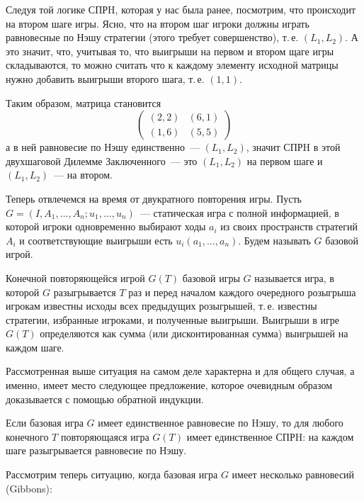 Следуя той логике СПРH,  которая у нас была ранее, посмотрим, что
происходит на втором шаге игры. Ясно, что на втором шаг игроки
должны играть равновесные по Нэшу стратегии (этого требует совершенство),
т.\,е. $(L_1,L_2)$.  А это значит, что, учитывая то, что выигрыши на первом
и втором щаге игры складываются, то можно считать что к каждому
элементу исходной матрицы нужно добавить выигрыши второго шага, т.\,е. $(1,1)$.

Таким образом, матрица становится
$$
(\begin{array}{cc}
(2,2)&(6,1)\\
(1,6)&(5,5) \end{array})
$$
а в ней равновесие по Нэшу единственно~--- $(L_1,L_2)$, значит СПРH в этой
двухшаговой Дилемме Заключенного~--- это $(L_1,L_2)$ на
первом шаге и $(L_1,L_2)$~--- на втором.

Теперь отвлечемся на время от двукратного повторения игры. Пусть
$G=(I, A_1,\ldots,A_n;u_1,\ldots,u_n)$~--- статическая игра с полной
информацией, в которой игроки одновременно выбирают ходы $a_i$ из
своих пространств стратегий $A_i$ и соответствующие выигрыши есть
$u_i(a_1,\ldots,a_n)$.  Будем называть $G$ базовой игрой.

\begin{definition}
Конечной повторяющейся игрой $G(T)$ базовой игры $G$ называется игра,
в которой $G$ разыгрывается $T$ раз и перед началом каждого
очередного розыгрыша игрокам известны исходы всех предыдущих
розыгрышей, т.\,е. известны стратегии, избранные игроками, и
полученные выигрыши. Выигрыши в игре $G(T)$ определяются как сумма
(или дисконтированная сумма) выигрышей на каждом шаге.
\end{definition}

Рассмотренная выше ситуация на самом деле характерна и для общего
случая, а именно, имеет место следующее предложение, которое
очевидным образом доказывается с помощью обратной индукции.

\begin{proposition}
Если базовая игра $G$ имеет единственное
равновесие по Hэшу, то для любого конечного $T$ повторяющаяся игра
$G(T)$ имеет единственное СПРH: на каждом шаге разыгрывается
равновесие по Нэшу.
\end{proposition}

Рассмотрим теперь ситуацию, когда базовая игра $G$ имеет несколько
равновесий (Gibbons):

